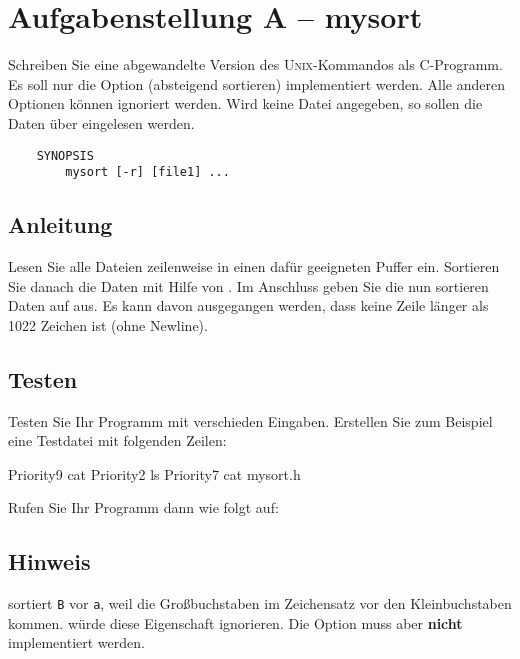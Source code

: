 




\section*{Aufgabenstellung A -- mysort}
Schreiben Sie eine abgewandelte Version des \textsc{Unix}-Kommandos
 als C-Programm. Es soll nur die Option  (absteigend
sortieren) implementiert werden. Alle anderen Optionen können ignoriert werden.
Wird keine Datei angegeben, so sollen die Daten über 
eingelesen werden.

\begin{verbatim}
    SYNOPSIS
        mysort [-r] [file1] ...
\end{verbatim}

\subsection*{Anleitung}
Lesen Sie alle Dateien zeilenweise in einen dafür geeigneten Puffer ein.
Sortieren Sie danach die Daten mit Hilfe von . Im Anschluss
geben Sie die nun sortieren Daten auf  aus. Es kann davon
ausgegangen werden, dass keine Zeile länger als 1022 Zeichen ist (ohne Newline).

\subsection*{Testen}
Testen Sie Ihr Programm mit verschieden Eingaben. Erstellen Sie zum Beispiel
eine Testdatei  mit folgenden Zeilen:

\begin{osuefmtcode}
  Priority9 cat
  Priority2 ls
  Priority7 cat mysort.h
\end{osuefmtcode}

Rufen Sie Ihr Programm dann wie folgt auf:


\subsection*{Hinweis}
 sortiert \verb+B+ vor \verb+a+, weil
die Großbuchstaben im Zeichensatz vor den Kleinbuchstaben kommen.
 würde diese Eigenschaft ignorieren.
Die Option  muss aber \textbf{nicht} implementiert werden.

\osueguidelinesone


